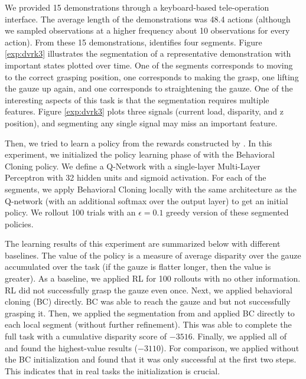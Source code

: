 We provided 15 demonstrations through a keyboard-based tele-operation interface.
The average length of the demonstrations was 48.4 actions (although we sampled observations at a higher frequency about 10 observations for every action).
From these 15 demonstrations, \hirl identifies four segments. Figure \ref{exp:dvrk3} illustrates the segmentation of a representative demonstration with important states plotted over time.
One of the segments corresponds to moving to the correct grasping position, one corresponds to making the grasp, one lifting the gauze up again, and one corresponds to straightening the gauze.
One of the interesting aspects of this task is that the segmentation requires multiple features.
Figure \ref{exp:dvrk3} plots three signals (current load, disparity, and z position), and segmenting any single signal may miss an important feature. 

Then, we tried to learn a policy from the rewards constructed by \hirl.
In this experiment, we initialized the policy learning phase of \hirl with the Behavioral Cloning policy.
We define a Q-Network with a single-layer Multi-Layer Perceptron with 32 hidden units and sigmoid activation.
For each of the segments, we apply Behavioral Cloning locally with the same architecture as the Q-network (with an additional softmax over the output layer) to get an initial policy. We rollout 100 trials with an $\epsilon=0.1$ greedy version of these segmented policies.

The learning results of this experiment are summarized below with different baselines.
The value of the policy is a measure of average disparity over the gauze accumulated over the task (if the gauze is flatter longer, then the value is greater).
As a baseline, we applied RL for 100 rollouts with no other information. RL did not successfully grasp the gauze even once.
Next, we applied behavioral cloning (BC) directly.
BC was able to reach the gauze and but not successfully grasping it.
Then, we applied the segmentation from \hirl  and applied BC directly to each local segment (without further refinement). 
This was able to complete the full task with a cumulative disparity score of $-3516$.
Finally, we applied all of \hirl and found the highest-value results ($-3110$).
For comparison, we applied \hirl without the BC initialization and found that it was only successful at the first two steps.
This indicates that in real tasks the initialization is crucial.

